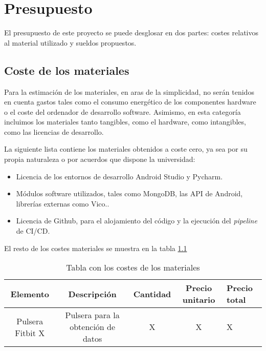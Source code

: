 \chapter{Presupuesto}
\label{chapter:presupuesto}


El presupuesto de este proyecto se puede desglosar en dos partes: costes relativos al material utilizado y sueldos propuestos.


\section{Coste de los materiales}

Para la estimación de los materiales, en aras de la simplicidad, no serán tenidos en cuenta gastos tales como el consumo energético de los componentes hardware o el coste del ordenador de desarrollo software.  Asimismo, en esta categoría incluimos los materiales tanto tangibles, como el hardware, como intangibles, como las licencias de desarrollo.

La siguiente lista contiene los materiales obtenidos a coste cero, ya sea por su propia naturaleza o por acuerdos que dispone la universidad:
\begin{itemize}
    \item Licencia de los entornos de desarrollo Android Studio y Pycharm.
    \item Módulos software utilizados, tales como MongoDB, las API de Android, librerías externas como Vico..
    \item Licencia de Github, para el alojamiento del código y la ejecución del \textit{pipeline} de CI/CD.
\end{itemize}

El resto de los costes materiales se muestra en la tabla \ref{tab:costes_materiales}

\begin{table}
    \centering
    \begin{tabular}{|c|c|c|c|l|} \hline 
         Elemento&  Descripción&  Cantidad& Precio unitario&Precio total\\ \hline 
         Pulsera Fitbit X&  Pulsera para la obtención de datos&  X&  X&X\\ \hline 
    \end{tabular}
    \caption{Tabla con los costes de los materiales}
    \label{tab:costes_materiales}
\end{table}

